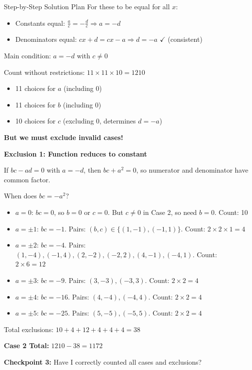 \documentclass[12pt]{article}
\begin{document}
\begin{roadmapbox}{Step-by-Step Solution Plan}
For these to be equal for all $x$:
\begin{itemize}
    \item Constants equal: $\frac{a}{c} = -\frac{d}{c} \Rightarrow a = -d$
    \item Denominators equal: $cx+d = cx-a \Rightarrow d = -a$ $\checkmark$ (consistent)
\end{itemize}

Main condition: $a=-d$ with $c \neq 0$

Count without restrictions: $11 \times 11 \times 10 = 1210$
\begin{itemize}
    \item 11 choices for $a$ (including 0)
    \item 11 choices for $b$ (including 0)  
    \item 10 choices for $c$ (excluding 0, determines $d=-a$)
\end{itemize}

\textbf{But we must exclude invalid cases!}

\textbf{Exclusion 1: Function reduces to constant}

If $bc - ad = 0$ with $a=-d$, then $bc + a^2 = 0$, so numerator and denominator have common factor.

When does $bc = -a^2$?

\begin{itemize}
    \item $a=0$: $bc=0$, so $b=0$ or $c=0$. But $c \neq 0$ in Case 2, so need $b=0$. Count: 10
    \item $a=\pm 1$: $bc=-1$. Pairs: $(b,c) \in \{(1,-1), (-1,1)\}$. Count: $2 \times 2 \times 1 = 4$
    \item $a=\pm 2$: $bc=-4$. Pairs: $(1,-4), (-1,4), (2,-2), (-2,2), (4,-1), (-4,1)$. Count: $2 \times 6 = 12$
    \item $a=\pm 3$: $bc=-9$. Pairs: $(3,-3), (-3,3)$. Count: $2 \times 2 = 4$
    \item $a=\pm 4$: $bc=-16$. Pairs: $(4,-4), (-4,4)$. Count: $2 \times 2 = 4$
    \item $a=\pm 5$: $bc=-25$. Pairs: $(5,-5), (-5,5)$. Count: $2 \times 2 = 4$
\end{itemize}

Total exclusions: $10 + 4 + 12 + 4 + 4 + 4 = 38$

\textbf{Case 2 Total:} $1210 - 38 = 1172$

\textbf{Checkpoint 3:} Have I correctly counted all cases and exclusions?


\end{roadmapbox}
\end{document}
